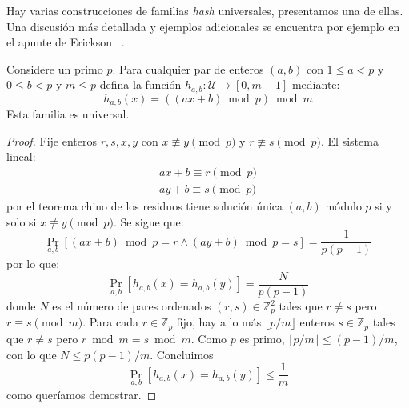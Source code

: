   Hay varias construcciones de familias
  \emph{\foreignlanguage{english}{hash}} universales,
  presentamos una de ellas.
  Una discusión más detallada
  y ejemplos adicionales
  se encuentra por ejemplo en el apunte de Erickson~%
    \cite{erickson19:_algorithms}.
  \begin{theorem}
    \label{theo:universal-multiplicative-hash}
    Considere un primo \(p\).
    Para cualquier par de enteros \((a, b)\)
    con \(1 \le a < p\) y \(0 \le b < p\)
    y \(m \le p\)
    defina la función \(h_{a, b} \colon \mathscr{U} \to [0, m - 1]\)
    mediante:
    \begin{equation}
      h_{a, b}(x)
        = ((a x + b) \bmod p) \bmod m
    \end{equation}
    Esta familia es universal.
  \end{theorem}
  \begin{proof}
    Fije enteros \(r, s, x, y\)
    con \(x \not\equiv y \pmod{p}\) y \(r \not\equiv s \pmod{p}\).
    El sistema lineal:
    \begin{align*}
      a x + b
        \equiv r \pmod{p} \\
      a y + b
        \equiv s \pmod{p}
    \end{align*}
    por el teorema chino de los residuos
    tiene solución única \((a, b)\) módulo \(p\)
    si y solo si \(x \not\equiv y \pmod{p}\).
    Se sigue que:
    \begin{equation*}
      \Pr_{a, b}[(a x + b) \bmod p = r
                    \wedge (a y + b) \bmod p = s]
        = \frac{1}{p (p - 1)}
    \end{equation*}
    por lo que:
    \begin{equation*}
      \Pr_{a, b}[h_{a, b}(x) = h_{a, b}(y)]
        = \frac{N}{p (p - 1)}
    \end{equation*}
    donde \(N\) es el número de pares ordenados \((r, s) \in \mathbb{Z}_p^2\)
    tales que \(r \ne s\) pero \(r \equiv s \pmod{m}\).
    Para cada \(r \in \mathbb{Z}_p\) fijo,
    hay a lo más \(\lfloor p / m \rfloor\) enteros \(s \in \mathbb{Z}_p\)
    tales que \(r \ne s\) pero \(r \bmod m = s \bmod m\).
    Como \(p\) es primo,
    \(\lfloor p / m \rfloor \le (p - 1) / m\),
    con lo que \(N \le p (p - 1) / m\).
    Concluimos
    \begin{equation*}
      \Pr_{a, b}[h_{a, b}(x) = h_{a, b}(y)]
        \le \frac{1}{m}
    \end{equation*}
    como queríamos demostrar.
  \end{proof}

